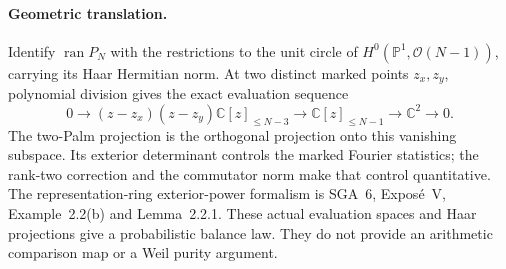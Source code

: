 \paragraph{Geometric translation.}
Identify $\operatorname{ran}P_N$ with the restrictions to the unit
circle of $H^0(\mathbb P^1,\mathcal O(N-1))$, carrying its Haar
Hermitian norm. At two distinct marked points $z_x,z_y$, polynomial
division gives the exact evaluation sequence
\[
 0\longrightarrow (z-z_x)(z-z_y)\mathbb C[z]_{\le N-3}
 \longrightarrow\mathbb C[z]_{\le N-1}
 \longrightarrow\mathbb C^2\longrightarrow0.
\]
The two-Palm projection is the orthogonal projection onto this
vanishing subspace. Its exterior determinant controls the marked
Fourier statistics; the rank-two correction and the commutator
norm make that control quantitative. The representation-ring
exterior-power formalism is SGA~6, Expos\'e~V, Example~2.2(b) and
Lemma~2.2.1. These actual evaluation spaces and Haar projections
give a probabilistic balance law. They do not provide an
arithmetic comparison map or a Weil purity argument.
